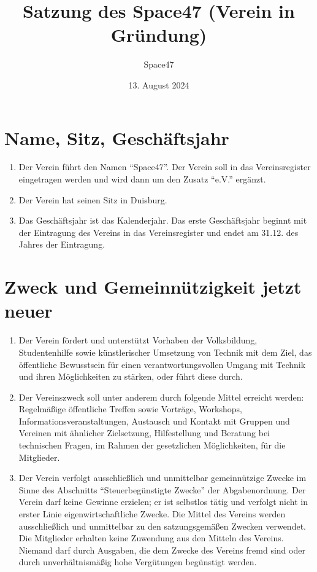 \documentclass[a4paper]{article}
\title{Satzung des Space47 (Verein in Gründung)}
\author{Space47}
\date{13. August 2024}
\begin{document}
\maketitle

\section{Name, Sitz, Geschäftsjahr}
\begin{enumerate}
	\item Der Verein führt den Namen \enquote{Space47}. Der Verein soll in das Vereinsregister eingetragen werden und wird dann um den Zusatz \enquote{e.V.} ergänzt.
	\item Der Verein hat seinen Sitz in Duisburg.
	\item Das Geschäftsjahr ist das Kalenderjahr. Das erste Geschäftsjahr beginnt mit der Eintragung des Vereins in das Vereinsregister und endet am 31.12. des Jahres der Eintragung.
\end{enumerate}

\section{Zweck und Gemeinnützigkeit jetzt neuer}
\begin{enumerate}
	\item Der Verein fördert und unterstützt Vorhaben der Volksbildung, Studentenhilfe sowie künstlerischer Umsetzung von Technik mit dem Ziel, das öffentliche Bewusstsein für einen verantwortungsvollen Umgang mit Technik und ihren Möglichkeiten zu stärken, oder führt diese durch.
	\item Der Vereinszweck soll unter anderem durch folgende Mittel erreicht werden: Regelmäßige öffentliche Treffen sowie Vorträge, Workshops, Informationsveranstaltungen, Austausch und Kontakt mit Gruppen und Vereinen mit ähnlicher Zielsetzung, Hilfestellung und Beratung bei technischen Fragen, im Rahmen der gesetzlichen Möglichkeiten, für die Mitglieder.
	\item Der Verein verfolgt ausschließlich und unmittelbar gemeinnützige Zwecke im Sinne des Abschnitts \enquote{Steuerbegünstigte Zwecke} der Abgabenordnung. Der Verein darf keine Gewinne erzielen; er ist selbstlos tätig und verfolgt nicht in erster Linie eigenwirtschaftliche Zwecke. Die Mittel des Vereins werden ausschließlich und unmittelbar zu den satzungsgemäßen Zwecken verwendet. Die Mitglieder erhalten keine Zuwendung aus den Mitteln des Vereins. Niemand darf durch Ausgaben, die dem Zwecke des Vereins fremd sind oder durch unverhältnismäßig hohe Vergütungen begünstigt werden. 
\end{enumerate}
\end{document}
